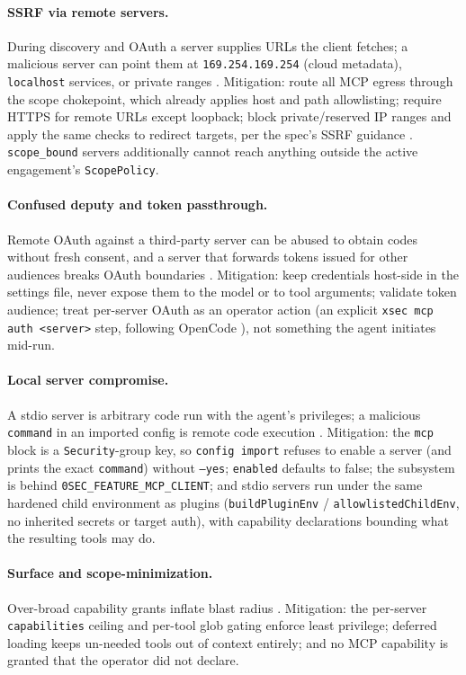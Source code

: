 \documentclass[11pt]{article}
\begin{document}
\paragraph{SSRF via remote servers.} During discovery and OAuth a server
supplies URLs the client fetches; a malicious server can point them at
\texttt{169.254.169.254} (cloud metadata), \texttt{localhost} services, or
private ranges \cite{mcp-security}. Mitigation: route all MCP egress through the
scope chokepoint, which already applies host and path allowlisting; require
HTTPS for remote URLs except loopback; block private/reserved IP ranges and
apply the same checks to redirect targets, per the spec's SSRF guidance
\cite{mcp-security}. \texttt{scope\_bound} servers additionally cannot reach
anything outside the active engagement's \texttt{ScopePolicy}.

\paragraph{Confused deputy and token passthrough.} Remote OAuth against a
third-party server can be abused to obtain codes without fresh consent, and a
server that forwards tokens issued for other audiences breaks OAuth boundaries
\cite{mcp-security}. Mitigation: keep credentials host-side in the settings
file, never expose them to the model or to tool arguments; validate token
audience; treat per-server OAuth as an operator action (an explicit
\texttt{xsec mcp auth <server>} step, following OpenCode \cite{opencode-mcp}),
not something the agent initiates mid-run.

\paragraph{Local server compromise.} A stdio server is arbitrary code run with
the agent's privileges; a malicious \texttt{command} in an imported config is
remote code execution \cite{mcp-security}. Mitigation: the \texttt{mcp} block is
a \texttt{Security}-group key, so \texttt{config import} refuses to enable a
server (and prints the exact \texttt{command}) without \texttt{--yes};
\texttt{enabled} defaults to false; the subsystem is behind
\texttt{0SEC\_FEATURE\_MCP\_CLIENT}; and stdio servers run under the same hardened
child environment as plugins (\texttt{buildPluginEnv} / \texttt{allowlistedChildEnv},
no inherited secrets or target auth), with capability declarations bounding what
the resulting tools may do.

\paragraph{Surface and scope-minimization.} Over-broad capability grants inflate
blast radius \cite{mcp-security}. Mitigation: the per-server \texttt{capabilities}
ceiling and per-tool glob gating enforce least privilege; deferred loading keeps
un-needed tools out of context entirely; and no MCP capability is granted that
the operator did not declare.
\end{document}
